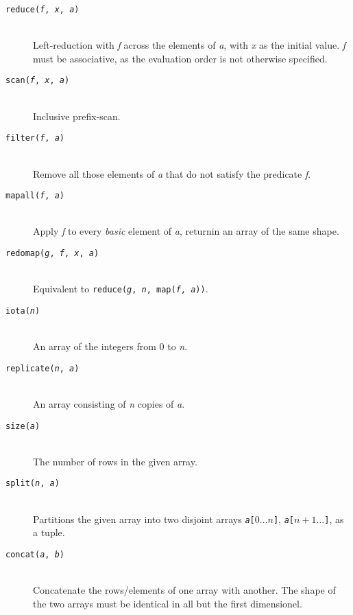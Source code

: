 \documentclass[oneside]{memoir}
\begin{document}
\begin{description}
  \item[\texttt{reduce(\textit{f}, \textit{x}, \textit{a})}]\hfill\\
    Left-reduction with \textit{f} across the elements of \textit{a},
    with \textit{x} as the initial value.  \textit{f} must be
    associative, as the evaluation order is not otherwise specified.

  \item[\texttt{scan(\textit{f}, \textit{x}, \textit{a})}]\hfill\\
    Inclusive prefix-scan.

  \item[\texttt{filter(\textit{f}, \textit{a})}]\hfill\\
    Remove all those elements of \textit{a} that do not satisfy the
    predicate \textit{f}.

  \item[\texttt{mapall(\textit{f}, \textit{a})}]\hfill\\
    Apply \textit{f} to every \emph{basic} element of \textit{a},
    returnin an array of the same shape.

  \item[\texttt{redomap(\textit{g}, \textit{f}, \textit{x}, \textit{a})}]\hfill\\
    Equivalent to \texttt{reduce(\textit{g}, \textit{n}, map(\textit{f}, \textit{a}))}.

  \item[\texttt{iota(\textit{n})}]\hfill\\
    An array of the integers from $0$ to \textit{n}.

  \item[\texttt{replicate(\textit{n}, \textit{a})}]\hfill\\
    An array consisting of \textit{n} copies of \textit{a}.

  \item[\texttt{size(\textit{a})}]\hfill\\
    The number of rows in the given array.

  \item[\texttt{split(\textit{n}, \textit{a})}]\hfill\\
    Partitions the given array into two disjoint arrays
    \texttt{\textit{a}[$0\ldots{}n$]}, \texttt{\textit{a}[$n+1\ldots{}$]}, as a tuple.

  \item[\texttt{concat(\textit{a}, \textit{b})}]\hfill\\
    Concatenate the rows/elements of one array with another.  The
    shape of the two arrays must be identical in all but the first
    dimensionel.


\end{description}
\end{document}

